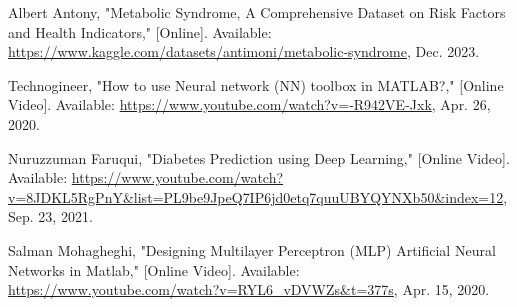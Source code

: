 
\begin{thebibliography}{1}

Albert Antony, "Metabolic Syndrome, A Comprehensive Dataset on Risk Factors and Health Indicators," [Online]. Available: \url{https://www.kaggle.com/datasets/antimoni/metabolic-syndrome}, Dec. 2023.

Technogineer, "How to use Neural network (NN) toolbox in MATLAB?," [Online Video]. Available: \url{https://www.youtube.com/watch?v=-R942VE-Jxk}, Apr. 26, 2020.

Nuruzzuman Faruqui, "Diabetes Prediction using Deep Learning," [Online Video]. Available: \url{https://www.youtube.com/watch?v=8JDKL5RgPnY&list=PL9be9JpeQ7IP6jd0etq7quuUBYQYNXb50&index=12}, Sep. 23, 2021.

Salman Mohagheghi, "Designing Multilayer Perceptron (MLP) Artificial Neural Networks in Matlab," [Online Video]. Available: \url{https://www.youtube.com/watch?v=RYL6_vDVWZs&t=377s}, Apr. 15, 2020.

\end{thebibliography}